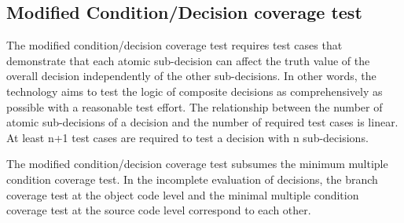 	\subsection{Modified Condition/Decision coverage test}

	The modified condition/decision coverage test requires test cases that demonstrate that each atomic sub-decision can affect the truth value of the overall decision independently of the other sub-decisions. In other words, the technology aims to test the logic of composite decisions as comprehensively as possible with a reasonable test effort. The relationship between the number of atomic sub-decisions of a decision and the number of required test cases is linear. At least n+1 test cases are required to test a decision with n sub-decisions.



	The modified condition/decision coverage test subsumes the minimum multiple condition coverage test. In the incomplete evaluation of decisions, the branch coverage test at the object code level and the minimal multiple condition coverage test at the source code level correspond to each other.



